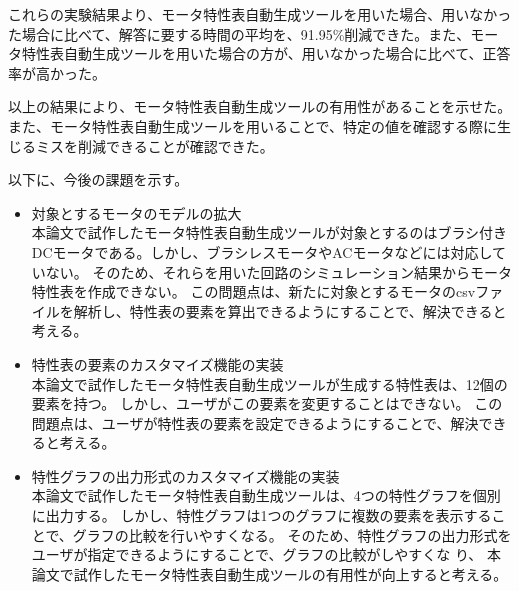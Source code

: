 \documentclass[uplatex, 10pt, a4p]{jsarticle}
\begin{document}
これらの実験結果より、モータ特性表自動生成ツールを用いた場合、用いなかった場合に比べて、解答に要する時間の平均を、91.95\%削減できた。また、モータ特性表自動生成ツールを用いた場合の方が、用いなかった場合に比べて、正答率が高かった。

以上の結果により、モータ特性表自動生成ツールの有用性があることを示せた。また、モータ特性表自動生成ツールを用いることで、特定の値を確認する際に生じるミスを削減できることが確認できた。


以下に、今後の課題を示す。

\begin{itemize}
  \setlength{\itemsep}{0pt}
  \item 対象とするモータのモデルの拡大\\
    本論文で試作したモータ特性表自動生成ツールが対象とするのはブラシ付きDCモータである。しかし、ブラシレスモータやACモータなどには対応していない。
    そのため、それらを用いた回路のシミュレーション結果からモータ特性表を作成できない。
    この問題点は、新たに対象とするモータのcsvファイルを解析し、特性表の要素を算出できるようにすることで、解決できると考える。

\item 特性表の要素のカスタマイズ機能の実装\\
本論文で試作したモータ特性表自動生成ツールが生成する特性表は、12個の要素を持つ。
  しかし、ユーザがこの要素を変更することはできない。
  この問題点は、ユーザが特性表の要素を設定できるようにすることで、解決できると考える。

\item 特性グラフの出力形式のカスタマイズ機能の実装\\
本論文で試作したモータ特性表自動生成ツールは、4つの特性グラフを個別に出力する。
しかし、特性グラフは1つのグラフに複数の要素を表示することで、グラフの比較を行いやすくなる。
そのため、特性グラフの出力形式をユーザが指定できるようにすることで、グラフの比較がしやすくな
り、 本論文で試作したモータ特性表自動生成ツールの有用性が向上すると考える。
\end{itemize}

\footnotesize


\end{document}
